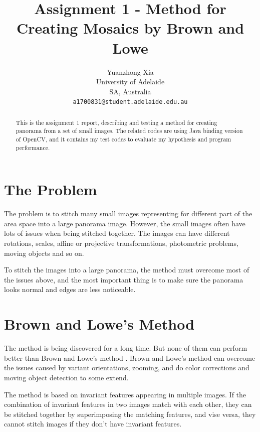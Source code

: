 \documentclass[10pt,twocolumn,letterpaper]{article}
\begin{document}
\title{Assignment 1 - Method for Creating Mosaics by Brown and Lowe}
\author{Yuanzhong Xia\\
University of Adelaide\\
SA, Australia\\
{\tt\small a1700831@student.adelaide.edu.au}
}
\maketitle

\begin{abstract}
This is the assignment 1 report, describing and testing a method for creating panorama from a set of small images.
The related codes are using Java binding version of OpenCV, and it contains my test codes to evaluate my hypothesis and program performance.
\end{abstract}


\section{The Problem}
The problem is to stitch many small images representing for different part of the area space into a large panorama image.
However, the small images often have lots of issues when being stitched together.
The images can have different rotations, scales, affine or projective transformations, photometric problems, moving objects and so on.

To stitch the images into a large panorama, the method must overcome most of the issues above,
and the most important thing is to make sure the panorama looks normal and edges are less noticeable.


\section{Brown and Lowe's Method}
The method is being discovered for a long time. But none of them can perform better than Brown and Lowe's method \cite{origin}.
Brown and Lowe's method can overcome the issues caused by variant orientations, zooming, and do color corrections and moving object detection to some extend.

The method is based on invariant features appearing in multiple images. If the combination of invariant features in two images match with each other,
they can be stitched together by superimposing the matching features, and vise versa, they cannot stitch images if they don't have invariant features. 
\end{document}
